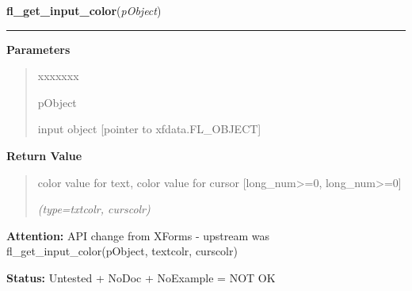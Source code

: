 \hspace{.8\funcindent}\begin{boxedminipage}{\funcwidth}

    \raggedright \textbf{fl\_get\_input\_color}(\textit{pObject})

    \vspace{-1.5ex}

    \rule{\textwidth}{0.5\fboxrule}
\setlength{\parskip}{2ex}
\setlength{\parskip}{1ex}
      \textbf{Parameters}
      \vspace{-1ex}

      \begin{quote}
        \begin{Ventry}{xxxxxxx}

          \item[pObject]

          input object [pointer to xfdata.FL\_OBJECT]

        \end{Ventry}

      \end{quote}

      \textbf{Return Value}
    \vspace{-1ex}

      \begin{quote}
      color value for text, color value for cursor 
      [long\_num{\textgreater}=0, long\_num{\textgreater}=0]

      {\it (type=txtcolr, curscolr)}

      \end{quote}

\textbf{Attention:} API change from XForms - upstream was fl\_get\_input\_color(pObject, 
textcolr, curscolr)



\textbf{Status:} Untested + NoDoc + NoExample = NOT OK



    \end{boxedminipage}

    \label{xformslib:library:fl_set_input_scroll}

    \vspace{0.5ex}

